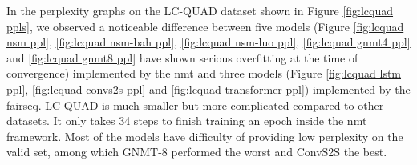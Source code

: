 In the perplexity graphs on the LC-QUAD dataset shown in Figure \ref{fig:lcquad ppls}, we observed a noticeable difference between five models (Figure \ref{fig:lcquad nsm ppl}, \ref{fig:lcquad nsm-bah ppl}, \ref{fig:lcquad nsm-luo ppl}, \ref{fig:lcquad gnmt4 ppl} and \ref{fig:lcquad gnmt8 ppl} have shown serious overfitting at the time of convergence) implemented by the nmt and three models (Figure \ref{fig:lcquad lstm ppl}, \ref{fig:lcquad convs2s ppl} and \ref{fig:lcquad transformer ppl}) implemented by the fairseq. LC-QUAD is much smaller but more complicated compared to other datasets. It only takes 34 steps to finish training an epoch inside the nmt framework. Most of the models have difficulty of providing low perplexity on the valid set, among which GNMT-8 performed the worst and ConvS2S the best. 

